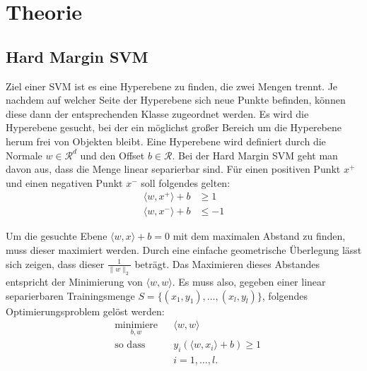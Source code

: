 \documentclass[ngerman]{scrartcl}
\begin{document}
\section{Theorie}
\subsection{Hard Margin SVM}
Ziel einer SVM ist es eine Hyperebene zu finden, die zwei Mengen trennt.
Je nachdem auf welcher Seite der Hyperebene sich neue Punkte befinden, können diese dann der entsprechenden Klasse zugeordnet werden.
Es wird die Hyperebene gesucht, bei der ein möglichst großer Bereich um die Hyperebene herum frei von Objekten bleibt.
Eine Hyperebene wird definiert durch die Normale $w \in \mathcal R^d$ und den Offset $b \in \mathcal R$.
Bei der Hard Margin SVM geht man davon aus, dass die Menge linear separierbar sind.
Für einen positiven Punkt $x^+$ und einen negativen Punkt $x^-$ soll folgendes gelten:
\begin{align}
\langle w , x^+ \rangle + b &\ge 1 \\
\langle w , x^- \rangle + b &\le -1 
\end{align}

Um die gesuchte Ebene $\langle w,x \rangle + b = 0$ mit dem maximalen Abstand zu finden, muss dieser maximiert werden.
Durch eine einfache geometrische Überlegung lässt sich zeigen, dass dieser $\frac{1}{\|w\|_2}$ beträgt. Das Maximieren dieses Abstandes entspricht der Minimierung von $\langle w,w \rangle$.
Es muss also, gegeben einer linear separierbaren Trainingsmenge $S = \lbrace(x_1, y_1),\ldots ,(x_l, y_l)\rbrace$, folgendes Optimierungsproblem gelöst werden:
\begin{align}
& \underset{b,w}{\text{minimiere}}& & \langle w,w \rangle \\
& \text{so dass } & & y_i \left( \langle w , x_i \rangle + b \right) \geq 1 \nonumber \\
& & &i = 1, \ldots, l. \nonumber
\end{align}
\end{document}
